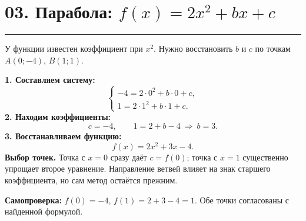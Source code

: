 \documentclass[a4paper,12pt]{article}
\newcommand{\sectionline}{\par\vspace{-4pt}\noindent\textcolor{accent}{\rule{\linewidth}{0.55pt}}\par\vspace{3pt}}
\newcommand{\accentbold}[1]{\textcolor{darkaccent}{\textbf{#1}}}
\begin{document}
\section*{03. Парабола: \(f(x)=2x^2+bx+c\)}
\sectionline
У функции известен коэффициент при \(x^2\). Нужно восстановить \(b\) и \(c\) по точкам \(A(0;-4)\), \(B(1;1)\).
\begin{center}
\end{center}
\textbf{1. Составляем систему:}
\[
\begin{cases}
-4=2\cdot0^2+b\cdot0+c,\\
1=2\cdot1^2+b\cdot1+c.
\end{cases}
\]
\textbf{2. Находим коэффициенты:}
\[
c=-4,\qquad 1=2+b-4\ \Longrightarrow\ b=3.
\]
\textbf{3. Восстанавливаем функцию:}
\[
\boxed{f(x)=2x^2+3x-4}.
\]
\accentbold{Выбор точек.} Точка с \(x=0\) сразу даёт \(c=f(0)\); точка с \(x=1\) существенно упрощает второе уравнение. Направление ветвей влияет на знак старшего коэффициента, но сам метод остаётся прежним.

\vspace{4mm}
\textbf{Самопроверка:} \(f(0)=-4\), \(f(1)=2+3-4=1\). Обе точки согласованы с найденной формулой.
\clearpage
\end{document}
